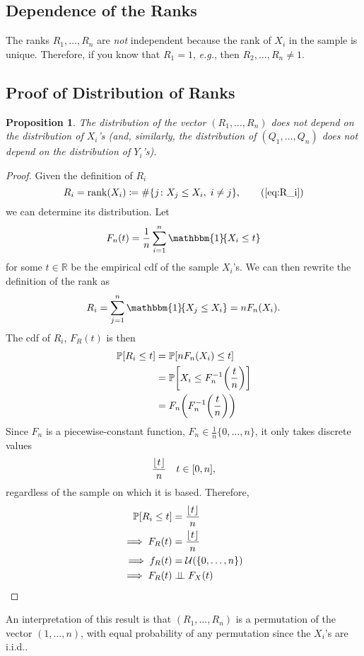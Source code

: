 \documentclass[letterpaper, reqno]{amsart}
\newtheorem{prop}{Proposition}[section]
\numberwithin{equation}{section}
\DeclarePairedDelimiter{\floor}{\lfloor}{\rfloor}
\newcommand{\Prob}[1]{\mathbb{P}\mleft[#1\mright]}
\newcommand{\R}{\mathbb{R}}  %
\newcommand{\indep}{\perp \!\!\! \perp}  %
\newcommand{\indic}[1]{\mathbbm{1}\!\mleft\{#1\mright\}} %
\newcommand{\iid}{i.i.d.}
\newcommand{\sumi}[2]{\sum_{#1=1}^{#2}}
\newcommand{\avg}[2]{\frac{1}{#2}\sumi{#1}{#2}}
\begin{document}
\subsection{Dependence of the Ranks}
The ranks $R_1, \dots, R_n$ are \emph{not} independent because the rank of $X_i$
in the sample is unique. Therefore, if you know that $R_1 = 1$, \emph{e.g.}, then
$R_2,\dots,R_n \ne 1$.

\subsection{Proof of Distribution of Ranks} \label{subsec:3}
\begin{prop}
  The distribution of the vector $(R_1, \dots, R_n)$ does \emph{not} depend on
  the distribution of $X_i$'s (and, similarly, the distribution of $(Q_1,
  \dots, Q_n)$ does not depend on the distribution of $Y_i$'s).
\end{prop}

\begin{proof}
  Given the definition of $R_i$
  \[ R_i = \operatorname{rank}(X_i) \coloneqq \#\{j \colon X_j \le X_i, \; i \ne j\}, \tag{\ref{eq:R_i}} \]
  we can determine its distribution. 
  Let 
  \[ F_n(t) = \avg{i}{n} \indic{X_i \le t} \] 
  for some $t \in \R$ be the empirical cdf of the sample $X_i$'s. 
  We can then rewrite the definition of the rank as
  \[ R_i = \sumi{j}{n} \indic{X_j \le X_i} = n F_n(X_i). \]
  The cdf of $R_i$, $F_R(t)$ is then
  \begin{align*}{3}
    \Prob{R_i \le t} &= \Prob{n F_n(X_i) \le t} \\
                     &= \Prob{X_i \le F_n^{-1}\mleft(\frac{t}{n}\mright)} \\
                     &= F_n\mleft(F_n^{-1}\mleft(\frac{t}{n}\mright)\mright)
  \end{align*}
  Since $F_n$ is a piecewise-constant function, $F_n \in \frac{1}{n} \{0, \dots, n\}$,
  it only takes discrete values
  \[ \frac{\floor{t}}{n} \quad t \in [0, n], \]
  regardless of the sample on which it is based.
  Therefore,
  \begin{align*}
    \Prob{R_i \le t} &= \frac{\floor{t}}{n} \\
    \implies F_R(t) &= \frac{\floor{t}}{n} \\
    \implies f_R(t) &= \mathcal{U}(\{0,\dots,n\}) \\
    \implies F_R(t) &\indep F_X(t) \qedhere
  \end{align*}
\end{proof}
An interpretation of this result is that $(R_1, \dots, R_n)$ is a permutation of
the vector $(1, \dots, n)$, with equal probability of any permutation since the
$X_i$'s are \iid.
\end{document}
